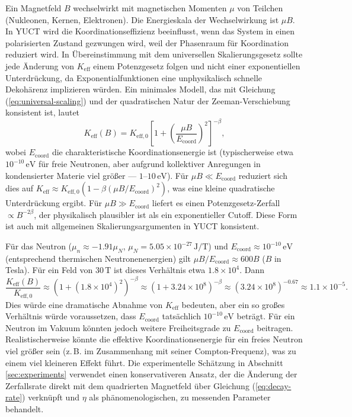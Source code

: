\documentclass[12pt]{article}
\theoremstyle{remark}
\newcommand{\Keff}{K_{\mathrm{eff}}}
\newcommand{\Keffzero}{K_{\mathrm{eff},0}}
\begin{document}
	Ein Magnetfeld \(B\) wechselwirkt mit magnetischen Momenten \(\mu\) von Teilchen (Nukleonen, Kernen, Elektronen). Die Energieskala der Wechselwirkung ist \(\mu B\). In YUCT wird die Koordinationseffizienz beeinflusst, wenn das System in einen polarisierten Zustand gezwungen wird, weil der Phasenraum für Koordination reduziert wird. In Übereinstimmung mit dem universellen Skalierungsgesetz sollte jede Änderung von \(\Keff\) einem Potenzgesetz folgen und nicht einer exponentiellen Unterdrückung, da Exponentialfunktionen eine unphysikalisch schnelle Dekohärenz implizieren würden. Ein minimales Modell, das mit Gleichung (\ref{eq:universal-scaling}) und der quadratischen Natur der Zeeman-Verschiebung konsistent ist, lautet
	\begin{equation}
		\Keff(B) = \Keffzero \left[ 1 + \left( \frac{\mu B}{E_{\mathrm{coord}}} \right)^2 \right]^{-\beta},
		\label{eq:keff-B}
	\end{equation}
	wobei \(E_{\mathrm{coord}}\) die charakteristische Koordinationsenergie ist (typischerweise etwa \(10^{-10}\,\text{eV}\) für freie Neutronen, aber aufgrund kollektiver Anregungen in kondensierter Materie viel größer — \(1\)–\(10\,\text{eV}\)). Für \(\mu B \ll E_{\mathrm{coord}}\) reduziert sich dies auf \(\Keff \approx \Keffzero (1 - \beta (\mu B/E_{\mathrm{coord}})^2)\), was eine kleine quadratische Unterdrückung ergibt. Für \(\mu B \gg E_{\mathrm{coord}}\) liefert es einen Potenzgesetz-Zerfall \(\propto B^{-2\beta}\), der physikalisch plausibler ist als ein exponentieller Cutoff. Diese Form ist auch mit allgemeinen Skalierungsargumenten in YUCT konsistent.
	
	Für das Neutron (\(\mu_n \approx -1.91\mu_N\), \(\mu_N = 5.05\times 10^{-27}\,\text{J/T}\)) und \(E_{\mathrm{coord}} \approx 10^{-10}\,\text{eV}\) (entsprechend thermischen Neutronenenergien) gilt \(\mu B / E_{\mathrm{coord}} \approx 600 B\) (\(B\) in Tesla). Für ein Feld von \(30\,\text{T}\) ist dieses Verhältnis etwa \(1.8\times10^4\). Dann
	\[
	\frac{\Keff(B)}{\Keffzero} \approx (1 + (1.8\times10^4)^2)^{-\beta} \approx (1 + 3.24\times10^8)^{-\beta} \approx (3.24\times10^8)^{-0.67} \approx 1.1\times10^{-5}.
	\]
	Dies würde eine dramatische Abnahme von \(\Keff\) bedeuten, aber ein so großes Verhältnis würde voraussetzen, dass \(E_{\mathrm{coord}}\) tatsächlich \(10^{-10}\,\text{eV}\) beträgt. Für ein Neutron im Vakuum könnten jedoch weitere Freiheitsgrade zu \(E_{\mathrm{coord}}\) beitragen. Realistischerweise könnte die effektive Koordinationsenergie für ein freies Neutron viel größer sein (z. B. im Zusammenhang mit seiner Compton-Frequenz), was zu einem viel kleineren Effekt führt. Die experimentelle Schätzung in Abschnitt \ref{sec:experiments} verwendet einen konservativeren Ansatz, der die Änderung der Zerfallsrate direkt mit dem quadrierten Magnetfeld über Gleichung (\ref{eq:decay-rate}) verknüpft und \(\eta\) als phänomenologischen, zu messenden Parameter behandelt.
	
\end{document}
